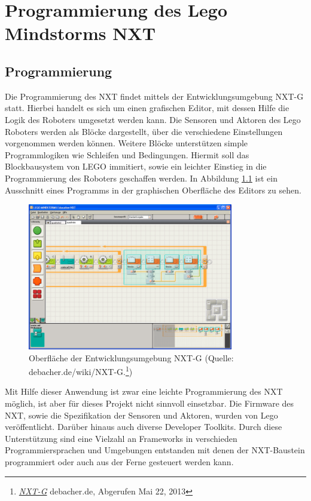 \chapter{Programmierung des Lego Mindstorms NXT}
\label{chap:Lego-Framework}


\section{Programmierung}

Die Programmierung des NXT findet mittels der Entwicklungsumgebung NXT-G statt. Hierbei handelt es sich um einen grafischen Editor, mit dessen Hilfe die Logik des Roboters umgesetzt werden kann. Die Sensoren und Aktoren des Lego Roboters werden als Bl\"ocke dargestellt, \"uber die verschiedene Einstellungen vorgenommen werden k\"onnen. Weitere Bl\"ocke unterst\"utzen simple Programmlogiken wie Schleifen und Bedingungen. Hiermit soll das Blockbausystem von LEGO immitiert, sowie ein leichter Einstieg in die Programmierung des Roboters geschaffen werden. In Abbildung \ref{fig:nxtg} ist ein Ausschnitt eines Programms in der graphischen Oberfl\"ache des Editors zu sehen.

\begin{figure}[htb]
\centering
\includegraphics[width=0.8\textwidth]{img/nxtg/800px-Mindst-eblock4.png}
\caption[Skeleton]{Oberfl\"ache der Entwicklungsumgebung NXT-G (Quelle: debacher.de/wiki/NXT-G.\footnote{\href{http://www.debacher.de/wiki/NXT-G}{\textit{NXT-G}} debacher.de, Abgerufen Mai 22, 2013})}
\label{fig:nxtg}
\end{figure}


\par\smallskip 
Mit Hilfe dieser Anwendung ist zwar eine leichte Programmierung des NXT m\"oglich, ist aber f\"ur dieses Projekt nicht sinnvoll einsetzbar. Die Firmware des NXT, sowie die Spezifikation der Sensoren und Aktoren, wurden von Lego ver\"offentlicht. Dar\"uber hinaus auch diverse Developer Toolkits. Durch diese Unterst\"utzung sind eine Vielzahl an Frameworks in verschieden Programmiersprachen und Umgebungen entstanden mit denen der NXT-Baustein programmiert oder auch aus der Ferne gesteuert werden kann.

